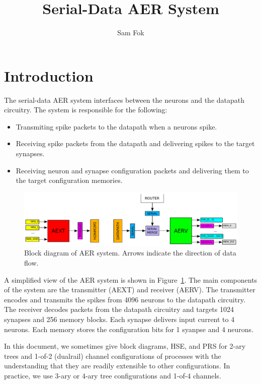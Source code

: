\documentclass{article}
\begin{document}
\title{Serial-Data AER System}
\author{Sam Fok}
\maketitle

\tableofcontents

\section{Introduction \label{sec:intro}}

The serial-data AER system interfaces between the neurons and the datapath
circuitry. The system is responsible for the following:
\begin{itemize}
    \item Transmiting spike packets to the datapath when a neurons spike. 
    \item Receiving spike packets from the datapath and delivering spikes
          to the target synapses.
    \item Receiving neuron and synapse configuration packets and delivering
          them to the target configuration memories.
\end{itemize}

\begin{figure}
    \centering
    \includegraphics[width=.95\textwidth]{img/aer_system.pdf}
    \caption{Block diagram of AER system. Arrows indicate the direction of data flow.}
    \label{fig:aer_system}
\end{figure}

A simplified view of the AER system is shown in Figure~\ref{fig:aer_system}.
The main components of the system are the transmitter (AEXT) and receiver (AERV).
The transmitter encodes and transmits the spikes from 4096 neurons to the 
datapath circuitry. The receiver decodes packets from the datapath circuitry 
and targets 1024 synapses and 256 memory blocks. Each synapse delivers input 
current to 4 neurons. Each memory stores the configuration bits for 1 syanpse 
and 4 neurons.

In this document, we sometimes give block diagrams, HSE, and PRS for 2-ary 
trees and 1-of-2 (dualrail) channel configurations of processes with the 
understanding that they are readily extensible to other configurations.
In practice, we use 3-ary or 4-ary tree configurations and 1-of-4 channels.
\end{document}
